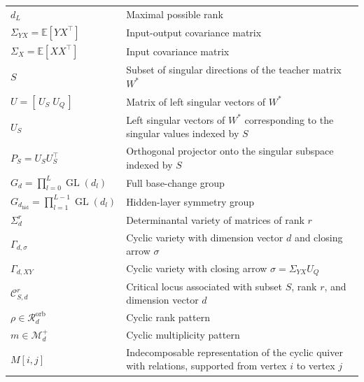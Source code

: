 \documentclass{article}
\newcommand{\GL}{\operatorname{GL}}
\theoremstyle{definition}
\begin{document}
\begin{center}
\begin{tabular}{p{} p{}}
$d_L$ & Maximal possible rank \\

$\Sigma_{YX}=\mathbb{E}[YX^\top]$ & Input-output covariance matrix \\

$\Sigma_X=\mathbb{E}[XX^\top]$ & Input covariance matrix \\

$S$ & Subset of singular directions of the teacher matrix $W^\ast$ \\

$U=[\,U_S\;U_Q\,]$ & Matrix of left singular vectors of $W^\ast$ \\

$U_S$ & Left singular vectors of $W^\ast$ corresponding to the singular values indexed by $S$ \\

$P_S=U_SU_S^\top$ & Orthogonal projector onto the singular subspace indexed by $S$ \\

$G_d=\prod_{l=0}^L \GL(d_l)$ & Full base-change group \\

$G_{d_{\mathrm{hid}}}=\prod_{l=1}^{L-1}\GL(d_l)$ & Hidden-layer symmetry group \\

$\Sigma_d^r$ & Determinantal variety of matrices of rank $r$ \\

$\Gamma_{d,\sigma}$ & Cyclic variety with dimension vector $d$ and closing arrow $\sigma$ \\

$\Gamma_{d,XY}$ & Cyclic variety with closing arrow $\sigma=\Sigma_{YX}U_Q$ \\

$\mathcal{C}_{S,d}^r$ & Critical locus associated with subset $S$, rank $r$, and dimension vector $d$ \\

$\rho\in\mathcal{R}_d^{\mathrm{orb}}$ & Cyclic rank pattern \\

$m\in\mathcal{M}_d^{+}$ & Cyclic multiplicity pattern \\

$M[i,j]$ & Indecomposable representation of the cyclic quiver with relations, supported from vertex $i$ to vertex $j$ \\
\bottomrule
\end{tabular}
\end{center}
\end{document}
